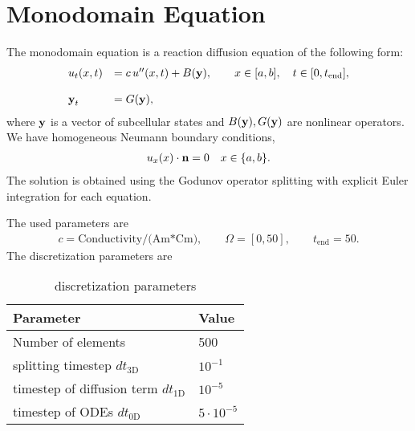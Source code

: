 %
\clearpage
%
\section{Monodomain Equation}
  The monodomain equation is a reaction diffusion equation of the following form:
  \begin{equation}\label{eq:monodomain1d}
    \begin{array}{lll}
      u_t(x,t) &= c\,u''(x,t) + B(\textbf{y}), \qquad x \in [a,b], \quad t \in [0,t_\text{end}],\\[4mm]
      \textbf{y}_t &= G(\textbf{y}),
    \end{array}
  \end{equation}
  where $\textbf{y}$ is a vector of subcellular states and $B(\textbf{y}), G(\textbf{y})$ are nonlinear operators.
  We have homogeneous Neumann boundary conditions,
  \begin{equation}\label{eq:monodomain1d_bc}
    \begin{array}{lll}
      u_x(x) \cdot \textbf{n} = 0 \quad  x \in \{a,b\}.
    \end{array}
  \end{equation}
  The solution is obtained using the Godunov operator splitting with explicit Euler integration for each equation.
  
  The used parameters are
  \begin{equation*}
    \begin{array}{lll}
      c = \text{Conductivity/(Am*Cm)},\qquad \Omega = [0,50], \qquad t_\text{end}=50.
    \end{array}
  \end{equation*}
  The discretization parameters are
  \begin{table}[h!]
    \begin{center}
      \begin{tabular}{l|l}
        \textbf{Parameter} & \textbf{Value}\\
        \hline
        Number of elements & 500\\
        splitting timestep $dt_\text{3D}$ & $10^{-1}$\\
        timestep of diffusion term $dt_\text{1D}$ & $10^{-5}$\\
        timestep of ODEs $dt_\text{0D}$ & $5\cdot 10^{-5}$
      \end{tabular}
    \end{center}
    \caption{discretization parameters}
    \label{tab:table_monodomain1}
  \end{table}

